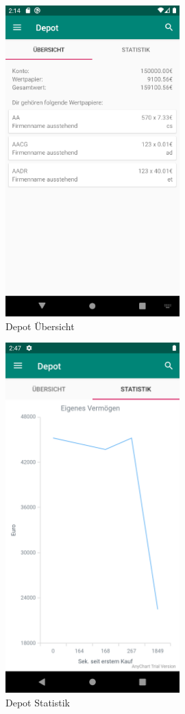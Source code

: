 \documentclass[10pt]{scrartcl}
\begin{document}
	
\begin{figure}[H]
	\centering
	\includegraphics[width=0.6\textwidth]{Bilder/Prsi/depot.png}
	\caption{Depot Übersicht}
\end{figure}
\begin{figure}[H]
	\centering
	\includegraphics[width=0.6\textwidth]{Bilder/Prsi/verlauf.png}
	\caption{Depot Statistik}
\end{figure}
\end{document}
